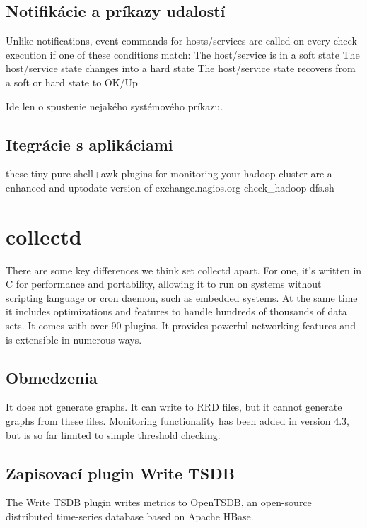 \documentclass[11pt,final,oneside]{fithesis}
\begin{document}
\subsection{Notifikácie a príkazy udalostí}
Unlike notifications, event commands for hosts/services are called on every check execution if one of these conditions match:
The host/service is in a soft state
The host/service state changes into a hard state
The host/service state recovers from a soft or hard state to OK/Up

Ide len o spustenie nejakého systémového príkazu.
\cite{09}

\subsection{Itegrácie s aplikáciami} 
these tiny pure shell+awk plugins for monitoring your hadoop cluster are a enhanced and uptodate version of exchange.nagios.org check\_hadoop-dfs.sh
\cite{10}



\section{collectd}
There are some key differences we think set collectd apart. For one, it's written in C for performance and portability, allowing it to run on systems without scripting language or cron daemon, such as embedded systems. 
At the same time it includes optimizations and features to handle hundreds of thousands of data sets. It comes with over 90 plugins. It provides powerful networking features and is extensible in numerous ways. 

\subsection{Obmedzenia}
It does not generate graphs. It can write to RRD files, but it cannot generate graphs from these files. 
Monitoring functionality has been added in version 4.3, but is so far limited to simple threshold checking. 
\cite{12}

\subsection{Zapisovací plugin Write TSDB}
The Write TSDB plugin writes metrics to OpenTSDB, an open-source distributed time-series database based on Apache HBase.
\cite{13}
\end{document}
